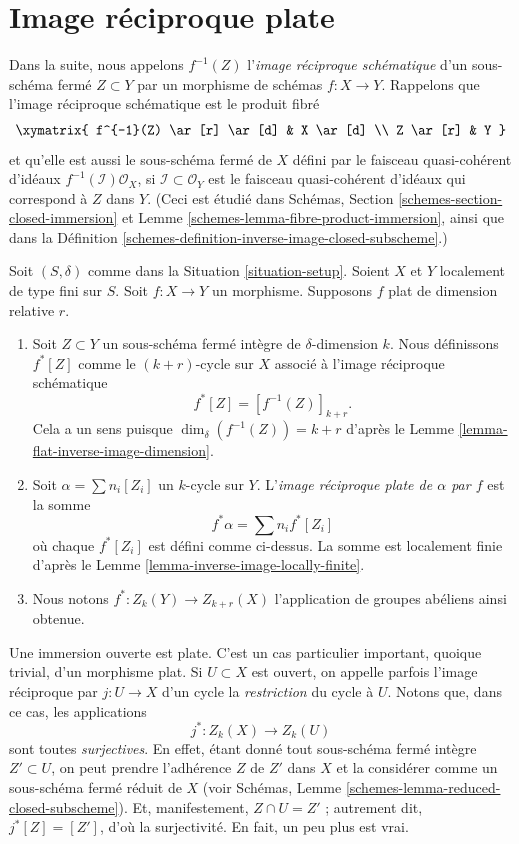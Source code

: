 \section{Image réciproque plate}
\label{section-flat-pullback}

\noindent
Dans la suite, nous appelons $f^{-1}(Z)$
l'{\it image réciproque schématique} d'un sous-schéma fermé
$Z \subset Y$ par un morphisme de schémas $f : X \to Y$.
Rappelons que l'image réciproque schématique est le produit fibré
$$
\xymatrix{
f^{-1}(Z) \ar[r] \ar[d] & X \ar[d] \\
Z \ar[r] & Y
}
$$
et qu'elle est aussi le sous-schéma fermé de $X$ défini par le
faisceau quasi-cohérent d'idéaux $f^{-1}(\mathcal{I})\mathcal{O}_X$, si
$\mathcal{I} \subset \mathcal{O}_Y$ est le faisceau quasi-cohérent d'idéaux
qui correspond à $Z$ dans $Y$.
(Ceci est étudié dans
Schémas, Section \ref{schemes-section-closed-immersion} et
Lemme \ref{schemes-lemma-fibre-product-immersion},
ainsi que dans la Définition \ref{schemes-definition-inverse-image-closed-subscheme}.)

\begin{definition}
\label{definition-flat-pullback}
Soit $(S, \delta)$ comme dans la Situation \ref{situation-setup}.
Soient $X$ et $Y$ localement de type fini sur $S$.
Soit $f : X \to Y$ un morphisme.
Supposons $f$ plat de dimension relative $r$.
\begin{enumerate}
\item Soit $Z \subset Y$ un sous-schéma fermé intègre de
$\delta$-dimension $k$. Nous définissons $f^*[Z]$ comme le
$(k+r)$-cycle sur $X$ associé à l'image réciproque schématique
$$
f^*[Z] = [f^{-1}(Z)]_{k+r}.
$$
Cela a un sens puisque $\dim_\delta(f^{-1}(Z)) = k + r$
d'après le Lemme \ref{lemma-flat-inverse-image-dimension}.
\item Soit $\alpha = \sum n_i [Z_i]$ un
$k$-cycle sur $Y$. L'{\it image réciproque plate de $\alpha$ par $f$}
est la somme
$$
f^* \alpha = \sum n_i f^*[Z_i]
$$
où chaque $f^*[Z_i]$ est défini comme ci-dessus.
La somme est localement finie d'après le Lemme \ref{lemma-inverse-image-locally-finite}.
\item Nous notons $f^* : Z_k(Y) \to Z_{k + r}(X)$ l'application de groupes
abéliens ainsi obtenue.
\end{enumerate}
\end{definition}

\noindent
Une immersion ouverte est plate. C'est un cas particulier important, quoique trivial,
d'un morphisme plat. Si $U \subset X$ est ouvert, on appelle parfois
l'image réciproque par $j : U \to X$ d'un cycle la {\it restriction} du
cycle à $U$. Notons que, dans ce cas, les applications
$$
j^* : Z_k(X) \longrightarrow Z_k(U)
$$
sont toutes {\it surjectives}. En effet, étant donné tout sous-schéma fermé
intègre $Z' \subset U$, on peut prendre l'adhérence $Z$ de $Z'$ dans $X$
et la considérer comme un sous-schéma fermé réduit de $X$ (voir
Schémas, Lemme \ref{schemes-lemma-reduced-closed-subscheme}).
Et, manifestement, $Z \cap U = Z'$ ; autrement dit,
$j^*[Z] = [Z']$, d'où la surjectivité. En fait, un peu plus
est vrai.


